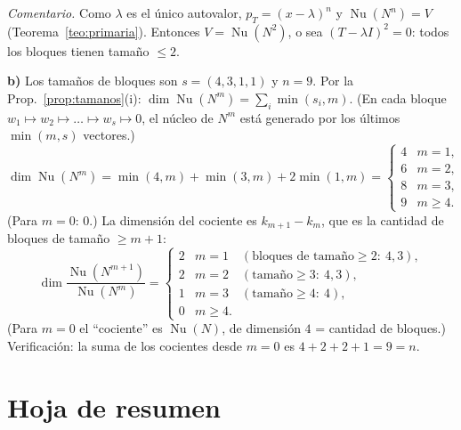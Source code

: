\documentclass{article}
\DeclareMathOperator{\Nu}{Nu}
\theoremstyle{plain}
\theoremstyle{definition}
\theoremstyle{remark}
\begin{document}
\emph{Comentario.} Como \(\lambda\) es el único autovalor, \(p_T=(x-\lambda)^n\) y \(\Nu(N^n)=V\) (Teorema~\ref{teo:primaria}). Entonces \(V=\Nu(N^2)\), o sea \((T-\lambda I)^2=0\): todos los bloques tienen tamaño \(\le2\).

\textbf{b)} Los tamaños de bloques son \(s=(4,3,1,1)\) y \(n=9\). Por la Prop.~\ref{prop:tamanos}(i): \(\dim\Nu(N^m)=\sum_i\min(s_i,m)\). (En cada bloque \(w_1\mapsto w_2\mapsto\dots\mapsto w_s\mapsto0\), el núcleo de \(N^m\) está generado por los últimos \(\min(m,s)\) vectores.)
\[
    \dim\Nu(N^m)=\min(4,m)+\min(3,m)+2\min(1,m)=
    \begin{cases}
        4 & m=1,   \\
        6 & m=2,   \\
        8 & m=3,   \\
        9 & m\ge4.
    \end{cases}
\]
(Para \(m=0\): \(0\).) La dimensión del cociente es \(k_{m+1}-k_m\), que es la cantidad de bloques de tamaño \(\ge m+1\):
\[
    \dim\frac{\Nu(N^{m+1})}{\Nu(N^m)}=
    \begin{cases}
        2 & m=1\quad(\text{bloques de tamaño}\ge2:\ 4,3), \\
        2 & m=2\quad(\text{tamaño}\ge3:\ 4,3),            \\
        1 & m=3\quad(\text{tamaño}\ge4:\ 4),              \\
        0 & m\ge4.
    \end{cases}
\]
(Para \(m=0\) el ``cociente'' es \(\Nu(N)\), de dimensión \(4\) = cantidad de bloques.) Verificación: la suma de los cocientes desde \(m=0\) es \(4+2+2+1=9=n\).

\newpage
\section{Hoja de resumen}
\end{document}
